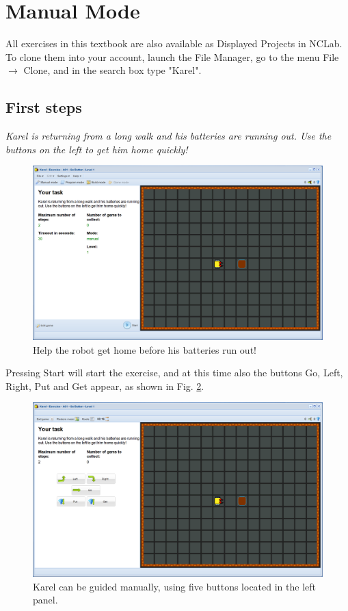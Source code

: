 \setcounter{section}{2}
\section{Manual Mode}

All exercises in this textbook are also available as Displayed Projects 
in NCLab. To clone them into your account, launch the File Manager, go
to the menu File $\rightarrow$ Clone, and in the search box type "Karel".  

\subsection{First steps}

{\em Karel is returning from a long walk and his batteries are running out. 
Use the buttons on the left to get him home quickly! }
\begin{figure}[!ht]
\begin{center}
\includegraphics[height=0.30\textwidth]{img/a01.png}
\end{center}
\vspace{-4mm}
\caption{Help the robot get home before his batteries run out!}
\label{fig:a01}
\end{figure}

\noindent
Pressing Start will start 
the exercise, and at this time also the buttons Go, Left, Right, Put and Get appear, 
as shown in Fig. \ref{fig:a01b}.


\begin{figure}[!ht]
\begin{center}
\includegraphics[height=0.30\textwidth]{img/a01b.png}
\end{center}
\vspace{-4mm}
\caption{Karel can be guided manually, using five buttons located in the left panel.}
\label{fig:a01b}
\vspace{-10mm}
\end{figure}

